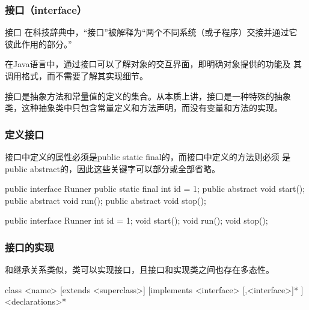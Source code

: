 \begin{frame}[fragile] %
  \frametitle{接口（interface）}

  \begin{block}{接口}
    在科技辞典中，“接口”被解释为“两个不同系统（或子程序）交接并通过它
    彼此作用的部分。”
  \end{block}

  \pause

  在Java语言中，通过接口可以了解对象的交互界面，即明确对象提供的功能及
  其调用格式，而不需要了解其实现细节。

  \pause

  接口是抽象方法和常量值的定义的集合。从本质上讲，接口是一种特殊的{\Red 抽象
  类}，这种抽象类中{\kai\Red 只包含常量定义和方法声明，而没有变量和方法的实现}。
\end{frame}

\begin{frame}[fragile] %
\frametitle{定义接口}

接口中定义的属性必须是public static final的，而接口中定义的方法则必须
是public abstract的，因此这些关键字可以部分或全部省略。


\begin{javaCode}
  public interface Runner {
    public static final int id = 1;
    public abstract void start();
    public abstract void run();
    public abstract void stop();
  }
\end{javaCode}


\begin{javaCode}
  public interface Runner {
    int id = 1;
    void start();
    void run();
    void stop();
  }
\end{javaCode}
\end{frame}

\begin{frame}[fragile] %
  \frametitle{接口的实现}

  和继承关系类似，类可以{\Red\hei 实现}接口，且接口和实现类之间也存在多态性。


  \begin{javaCode}
    [<modifier>] class <name> [extends <superclass>] [implements <interface> [,<interface>]* ] {
      <declarations>*
    }
  \end{javaCode}
\end{frame}

